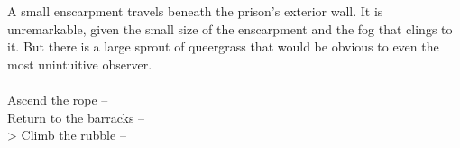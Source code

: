A small enscarpment travels beneath the prison's exterior wall. It is unremarkable, given the small size of the enscarpment and the fog that clings to it. But there is a large sprout of queergrass that would be obvious to even the most unintuitive observer.\\
\\

 Ascend the rope -- \\
 Return to the barracks -- \\
> Climb the rubble -- 